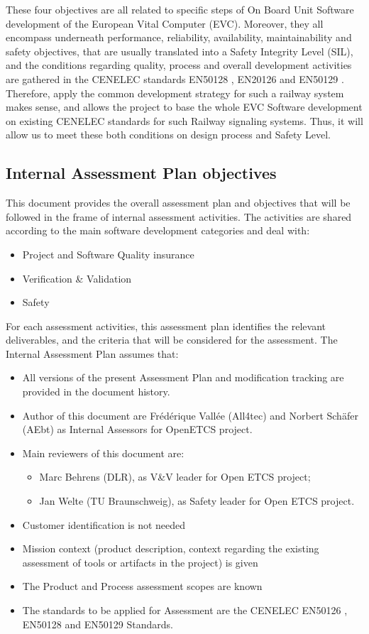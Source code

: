 \documentclass{template/openetcs_article}
\begin{document}
These four objectives are all related to specific steps of On Board Unit Software development of the European Vital Computer (EVC). Moreover, they all encompass underneath performance, reliability, availability, maintainability and safety objectives, that are usually translated into a Safety Integrity Level (SIL), and the conditions regarding quality, process and overall development activities are gathered in the CENELEC standards EN50128 \cite{EN50128}, EN20126 \cite{EN50216} and EN50129 \cite{EN50129}.
Therefore, apply the common development strategy for such a railway system makes sense, and allows the project to base the whole EVC Software development on existing CENELEC standards for such Railway signaling systems. Thus, it will allow us to meet these both conditions on design process and Safety Level.

\subsection{Internal Assessment Plan objectives}
This document provides the overall assessment plan and objectives that will be followed in the frame of internal assessment activities.
The activities are shared according to the main software development categories and deal with:
\begin{itemize}
\item Project and Software Quality insurance
\item Verification \& Validation
\item Safety
\end{itemize}

For each assessment activities, this assessment plan identifies the relevant deliverables, and the criteria that will be considered for the assessment.
The Internal Assessment Plan assumes that: 
\begin{itemize}
\item All versions of the present Assessment Plan and modification tracking are provided in the document history.
\item Author of this document are Fr\'ed\'erique Vall\'ee (All4tec) and Norbert Sch\"afer (AEbt) as Internal Assessors for OpenETCS project.
\item Main reviewers of this document are:
	\begin{itemize}
	\item Marc Behrens (DLR), as V\&V leader for Open ETCS project;
	\item Jan Welte (TU Braunschweig), as Safety leader for Open ETCS project.
	\end{itemize}
\item Customer identification is not needed
\item Mission context (product description, context regarding the existing assessment of tools or artifacts in the project) is given
\item The Product and Process assessment scopes are known
\item The standards to be applied for Assessment are the CENELEC EN50126 \cite{EN50126} , EN50128 \cite{EN50128} and EN50129 \cite{EN50129} Standards.
\end{itemize}
\end{document}
